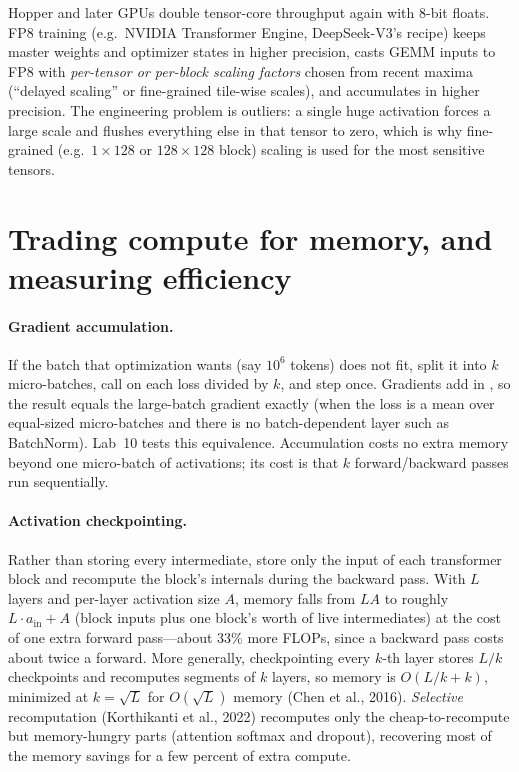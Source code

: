 \begin{systemslens}[FP8 training]
Hopper and later GPUs double tensor-core throughput again with 8-bit floats. FP8 training
(e.g.\ NVIDIA Transformer Engine, DeepSeek-V3's recipe) keeps master weights and optimizer
states in higher precision, casts GEMM inputs to FP8 with \emph{per-tensor or per-block scaling
factors} chosen from recent maxima (``delayed scaling'' or fine-grained tile-wise scales), and
accumulates in higher precision. The engineering problem is outliers: a single huge activation
forces a large scale and flushes everything else in that tensor to zero, which is why
fine-grained (e.g.\ $1\times128$ or $128\times128$ block) scaling is used for the most
sensitive tensors.
\end{systemslens}

\section{Trading compute for memory, and measuring efficiency}\label{sec:pretrain:efficiency}

\paragraph{Gradient accumulation.} If the batch that optimization wants (say $10^6$ tokens) does
not fit, split it into $k$ micro-batches, call  on each loss divided by $k$,
and step once. Gradients add in , so the result equals the large-batch gradient
exactly (when the loss is a mean over equal-sized micro-batches and there is no batch-dependent
layer such as BatchNorm). Lab~10 tests this equivalence. Accumulation costs no extra memory
beyond one micro-batch of activations; its cost is that $k$ forward/backward passes run
sequentially.

\paragraph{Activation checkpointing.} Rather than storing every intermediate, store only the
input of each transformer block and recompute the block's internals during the backward pass.
With $L$ layers and per-layer activation size $A$, memory falls from $LA$ to roughly
$L\cdot a_{\text{in}} + A$ (block inputs plus one block's worth of live intermediates) at the
cost of one extra forward pass---about 33\% more FLOPs, since a backward pass costs about twice
a forward. More generally, checkpointing every $k$-th layer stores $L/k$ checkpoints and
recomputes segments of $k$ layers, so memory is $O(L/k + k)$, minimized at $k=\sqrt L$ for
$O(\sqrt L)$ memory (Chen et al., 2016). \emph{Selective} recomputation (Korthikanti et al.,
2022) recomputes only the cheap-to-recompute but memory-hungry parts (attention softmax and
dropout), recovering most of the memory savings for a few percent of extra compute.


